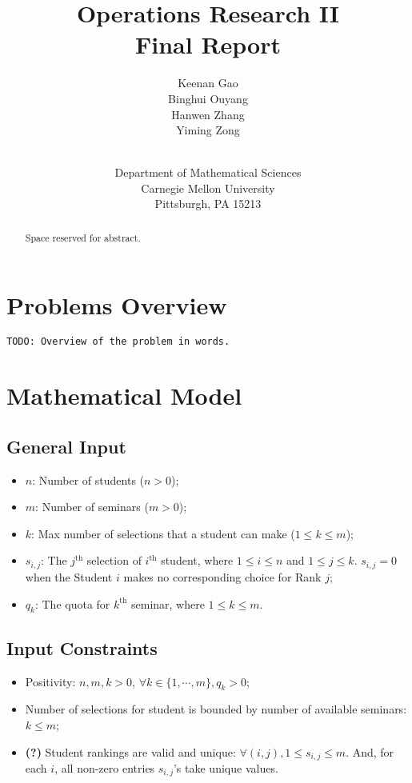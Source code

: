 \documentclass{article} %
\title{Operations Research II\\Final Report}
\author{
Keenan Gao \\
\And
Binghui Ouyang \\
\And
Hanwen Zhang \\
\And
Yiming Zong\\ \\
\and Department of Mathematical Sciences \\ Carnegie Mellon University \\ Pittsburgh, PA 15213
}
\begin{document}
\maketitle

\begin{abstract}
    Space reserved for abstract.
\end{abstract}


\section{Problems Overview}
    \texttt{TODO: Overview of the problem in words.}


\section{Mathematical Model}
\subsection{General Input}
\begin{itemize}
    \item $n$: Number of students ($n > 0$);
    \item $m$: Number of seminars ($m > 0$);
    \item $k$: Max number of selections that a student can make ($1 \leq k \leq m$);
    \item $s_{i,j}$: The $j^{\text{th}}$ selection of $i^{\text{th}}$ student, where $1\leq i \leq n$ and $1\leq j \leq k$. $s_{i,j}=0$ when the Student $i$ makes no corresponding choice for Rank $j$;
    \item $q_k$: The quota for $k^{\text{th}}$ seminar, where $1\leq k \leq m$.
\end{itemize}

\subsection{Input Constraints}
\begin{itemize}
    \item Positivity: $n,m,k>0$, $\forall k\in\{1,\cdots,m\}, q_k>0$;
    \item Number of selections for student is bounded by number of available seminars: $k \leq m$;
    \item \textbf{(?)} Student rankings are valid and unique: $\forall (i,j), 1\leq s_{i,j} \leq m$. And, for each $i$, all non-zero entries $s_{i,j}$'s take unique values.
\end{itemize}
\end{document}
